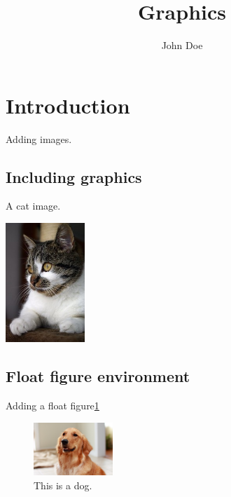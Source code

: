 \documentclass{article}
\title{Graphics}
\author{John Doe}
\date{}
\begin{document}
\maketitle
\section{Introduction}

Adding images.

\subsection{Including graphics}
A cat image.

\includegraphics[width=3cm]{image/cat.jpg}

\subsection{Float figure environment}
Adding a float figure\ref{fig:dog}

\begin{figure}[htbp]
	\begin{center}
		\includegraphics[width=3cm]{image/dog.jpg}
		\caption{This is a dog.}
		\label{fig:dog}
	\end{center}
\end{figure}
\end{document}
